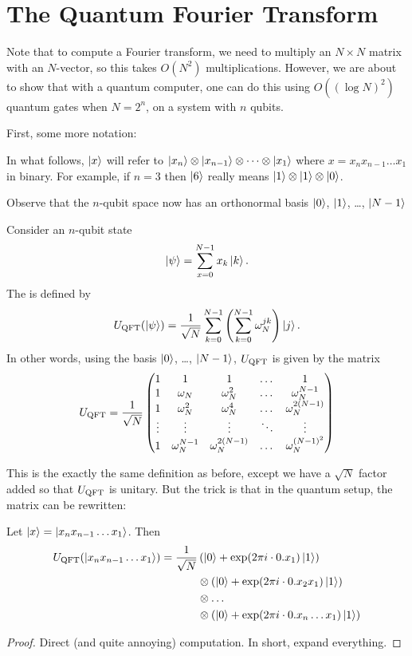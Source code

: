\documentclass[11pt]{scrreprt}
\begin{document}
\section{The Quantum Fourier Transform}
Note that to compute a Fourier transform, we need to multiply an $N \times N$ matrix
with an $N$-vector, so this takes $O(N^2)$ multiplications.
However, we are about to show that with a quantum computer,
one can do this using $O( (\log N)^2 )$ quantum gates when $N = 2^n$,
on a system with $n$ qubits.

First, some more notation:
\begin{abuse}
	In what follows, $\ket{x}$ will refer to
	$\ket{x_n} \otimes \ket{x_{n-1}} \otimes \dots \otimes \ket{x_1}$
	where $x = x_nx_{n-1} \dots x_1$ in binary.
	For example, if $n = 3$
	then $\ket{6}$ really means $\ket1 \otimes \ket1 \otimes \ket 0$.
\end{abuse}
Observe that the $n$-qubit space now has an
orthonormal basis $\ket0$, $\ket1$, \dots, $\ket{N-1}$

\begin{definition}
	Consider an $n$-qubit state
	\[ \ket\psi = \sum_{x=0}^{N-1} x_k \ket{k}. \]
	The  is defined by
	\[
		U_{\mathrm{QFT}}(\ket\psi) = \frac{1}{\sqrt N}\sum_{k=0}^{N-1}
		\left( \sum_{k=0}^{N-1} \omega_N^{jk} \right) \ket{j}.
	\]
	In other words, using the basis $\ket0$, \dots, $\ket{N-1}$,
	$U_{\mathrm{QFT}}$ is given by the matrix
	\[
		U_{\mathrm{QFT}} = \frac{1}{\sqrt N}
		\begin{pmatrix} 
			1 & 1 & 1 & \dots & 1 \\
			1 & \omega_N & \omega_N^2 & \dots & \omega_N^{N-1} \\
			1 & \omega_N^2 & \omega_N^4 & \dots & \omega_N^{2(N-1)} \\
			\vdots & \vdots & \vdots & \ddots & \vdots \\
			1 & \omega_N^{N-1} & \omega_N^{2(N-1)} & \dots & \omega_N^{(N-1)^2}
		\end{pmatrix}
	\]
\end{definition}
This is the exactly the same definition as before,
except we have a $\sqrt N$ factor added so that $U_{\mathrm{QFT}}$ is unitary.
But the trick is that in the quantum setup, the matrix can be rewritten:
\begin{proposition}
	Let $\ket x = \ket{x_nx_{n-1} \dots x_1}$.
	Then
	\begin{align*}
		U_{\mathrm{QFT}}( \ket{x_nx_{n-1} \dots x_1} )
		= \frac{1}{\sqrt N} &
		\left( \ket0 +\exp(2\pi i \cdot 0.x_1) \ket 1 \right) \\
		&\otimes \left( \ket0 +\exp(2\pi i \cdot 0.x_2x_1) \ket 1 \right) \\
		&\otimes \dots  \\
		&\otimes \left( \ket0 +\exp(2\pi i \cdot 0.x_n\dots x_1) \ket 1 \right)
	\end{align*}
\end{proposition}
\begin{proof}
	Direct (and quite annoying) computation.
	In short, expand everything.
\end{proof}
\end{document}
